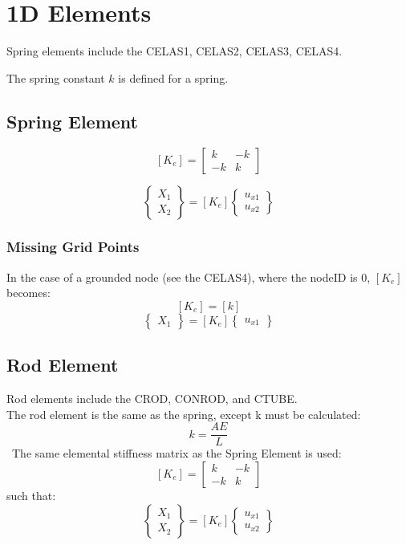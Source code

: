 \section{1D Elements}
   Spring elements include the CELAS1, CELAS2, CELAS3, CELAS4.

   The spring constant $k$ is defined for a spring.
   \subsection{Spring Element}
     \[ [K_e] = 
            \left[ \begin{array}{cc}
               k & -k \\
              -k &  k 
            \end{array}\right] \]

     \[ \left\{ \begin{array}{c}
              X_1 \\ X_2 \end{array}\right\} =
        [K_e] \left\{ \begin{array}{c}
              u_{x1} \\ u_{x2} \end{array}\right\} \]
   \subsubsection{Missing Grid Points}
   In the case of a grounded node (see the CELAS4), where the nodeID is 0,
     $[K_e]$ becomes:
     \[ [K_e] = [k]  \]
     \[ \left\{ \begin{array}{c}
              X_1 \end{array}\right\} =
        [K_e] \left\{ \begin{array}{c}
              u_{x1} \end{array}\right\} \]

   \subsection{Rod Element}
     Rod elements include the CROD, CONROD, and CTUBE. \\
     The rod element is the same as the spring, except k must be calculated:
       \[ k = \frac{AE}{L} \]\
     The same elemental stiffness matrix as the Spring Element is used:
       \[ [K_e] = 
            \left[ \begin{array}{cc}
               k & -k \\
              -k &  k 
            \end{array}\right]\]
     such that:
       \[ \left\{ \begin{array}{c}
              X_1 \\ X_2 \end{array}\right\} =
        [K_e] \left\{ \begin{array}{c}  
              u_{x1} \\ u_{x2} \end{array}\right\} \]
       
